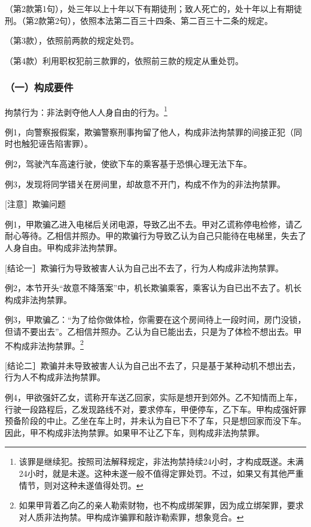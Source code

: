 （第2款第1句），处三年以上十年以下有期徒刑；致人死亡的，处十年以上有期徒刑。（第2款第2句），依照本法第二百三十四条、第二百三十二条的规定。

（第3款），依照前两款的规定处罚。

（第4款）利用职权犯前三款罪的，依照前三款的规定从重处罚。

\subsubsection*{（一）构成要件}

拘禁行为：非法剥夺他人人身自由的行为。\footnote{该罪是继续犯。按照司法解释规定，非法拘禁持续24小时，才构成既遂。未满24小时，就是未遂。这种未遂一般不值得定罪处罚。不过，如果又有其他严重情节，则对这种未遂值得处罚。}

例1，向警察报假案，欺骗警察刑事拘留了他人，构成非法拘禁罪的间接正犯（同时也触犯诬告陷害罪）。

例2，驾驶汽车高速行驶，使欲下车的乘客基于恐惧心理无法下车。

例3，发现将同学错关在房间里，却故意不开门，构成不作为的非法拘禁罪。

[注意］欺骗问题

例1，甲欺骗乙进入电梯后关闭电源，导致乙出不去。甲对乙谎称停电检修，请乙耐心等待。乙相信并照办。甲的欺骗行为导致乙认为自己只能待在电梯里，失去了人身自由。甲构成非法拘禁罪。

[结论一］欺骗行为导致被害人认为自己出不去了，行为人构成非法拘禁罪。

例2，本节开头“故意不降落案”中，机长欺骗乘客，乘客认为自已出不去了。机长构成非法拘禁罪。

例3，甲欺骗乙：“为了给你做体检，你需要在这个房间待上一段时间，房门没锁，但请不要出去”。乙相信并照办。乙认为自已能出去，只是为了体检不想出去。甲不构成非法拘禁罪。\footnote{如果甲背着乙向乙的亲人勒索财物，也不构成绑架罪，因为成立绑架罪，要求对人质非法拘禁。甲构成诈骗罪和敲诈勒索罪，想象竞合。}

[结论二］欺骗并未导致被害人认为自己出不去了，只是基于某种动机不想出去，行为人不构成非法拘禁罪。

例4，甲欲强奸乙女，谎称开车送乙回家，实际是想开到郊外。乙不知情而上车，行驶一段路程后，乙发现路线不对，要求停车，甲便停车，乙下车。甲构成强奸罪预备阶段的中止。乙坐在车上时，并未认为自已下不了车，只是想回家而没下车。因此，甲不构成非法拘禁罪。如果甲不让乙下车，则构成非法拘禁罪。

